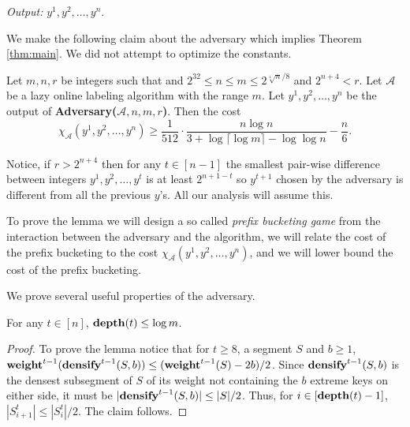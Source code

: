 \documentclass[runningheads,a4paper]{llncs}
\newcommand{\A}{\mathcal{A}}
\newcommand{\weight}{{\rm {\bf weight}}}
\newcommand{\depth}{{\rm {\bf depth}}}
\newcommand{\densify}{{\rm {\bf densify}}}
\begin{document}
\noindent\emph{Output:} $y^1,y^2,\dots,y^n$.

\medskip
We make the following claim about the adversary which implies Theorem \ref{thm:main}. We did not attempt to optimize
the constants.

\begin{lemma}\label{l-main}
Let $m,n,r$ be integers such that and $2^{32} \le n \le m \le 2^{\sqrt[4]{n}/8}$ and $2^{n+4}<r$. 
Let $\A$ be a lazy online labeling algorithm with the range $m$. 
Let $y^1,y^2,\dots,y^n$ be the output of {\bf Adversary($\A,n,m,r$)}. 
Then the cost $$\chi_\A(y^1,y^2,\dots,y^n) \ge \frac{1}{512} \cdot \frac{n \log n}{ 3 + \log \lceil \log m \rceil - \log \log n} - \frac{n}{6}.$$
\end{lemma}

%

Notice, if $r>2^{n+4}$ then for any $t\in[n-1]$ the smallest pair-wise difference between integers $y^1,y^2,\dots,y^t$ is
at least $2^{n+1-t}$ so $y^{t+1}$ chosen by the adversary is different from all the previous $y$'s. All our analysis will assume
this.
 
To prove the lemma we will design a so called \emph{prefix bucketing game} from the interaction between the
adversary and the algorithm, we will relate the cost of the prefix bucketing to the cost $\chi_\A(y^1,y^2,\dots,y^n)$,
and we will lower bound the cost of the prefix bucketing.

We prove several useful properties of the adversary.
 
\begin{lemma}
For any $t\in [n]$, $\depth(t)\le \log m$.
\end{lemma}

\begin{proof}
To prove the lemma notice that for $t\ge 8$, a segment $S$ and 
$b\ge 1$, $\weight^{t-1}(\densify^{t-1}(S,b)) \le (\weight^{t-1}(S)-2b)/2$. Since $\densify^{t-1}(S,b)$
is the densest subsegment of $S$ of its weight not containing the $b$ extreme keys on 
either side, it must be $|\densify^{t-1}(S,b)| \le |S|/2$.
Thus, for $i\in[\depth(t)-1]$, $|S^t_{i+1}| \le |S^t_{i}|/2$. The claim follows.
\end{proof}
\end{document}
